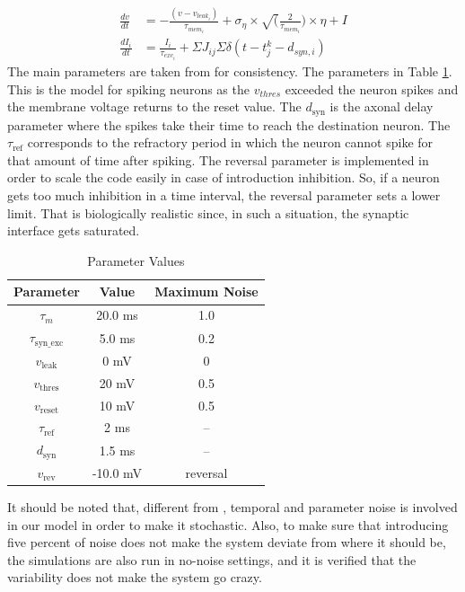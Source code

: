 \documentclass[a4paper,12pt]{article}
\begin{document}
\begin{equation}
    \begin{split}
        \frac{dv}{dt} & = -\frac{(v - v_{leak_i})}{\tau_{mem_i}}+ \sigma_\eta \times \sqrt(\frac{2}{\tau_{mem_i}}) \times \eta + I \\
        \frac{dI_{i}}{dt} & = \frac{I_{i}}{\tau_{exc_i}} + \Sigma J_{ij} \Sigma \delta (t - t_j^k - d_{syn,i} )
    \end{split}
    \label{diff_eqn}
\end{equation}
The main parameters are taken from \cite{brunel} for consistency. The parameters in Table \ref{parameterset}. This is the model for spiking neurons as the $v_{thres}$ exceeded the neuron spikes and the membrane voltage returns to the reset value. The $d_{\text{syn}}$ is the axonal delay parameter where the spikes take their time to reach the destination neuron. The $\tau_{\text{ref}}$ corresponds to the refractory period in which the neuron cannot spike for that amount of time after spiking. The reversal parameter is implemented in order to scale the code easily in case of introduction inhibition. So, if a neuron gets too much inhibition in a time interval, the reversal parameter sets a lower limit. That is biologically realistic since, in such a situation, the synaptic interface gets saturated.

\begin{table}[h]
    \centering
    \begin{tabular}{|c|c|c|}
    \hline
    Parameter & Value & Maximum Noise \\
    \hline
    $\tau_m$ & 20.0 ms & 1.0 \\
    $\tau_{\text{syn\_exc}}$ & 5.0 ms & 0.2 \\
    $v_{\text{leak}}$ & 0 mV & 0 \\
    $v_{\text{thres}}$ & 20 mV & 0.5 \\
    $v_{\text{reset}}$ & 10 mV & 0.5 \\
    $\tau_{\text{ref}}$ & 2 ms & -- \\
    $d_{\text{syn}}$ & 1.5 ms & -- \\
    $v_{\text{rev}}$ & -10.0 mV & reversal \\
    \hline
    \end{tabular}
    \caption{Parameter Values}
    \label{parameterset}
\end{table}
It should be noted that, different from \cite{brunel}, temporal and parameter noise is involved in our model in order to make it stochastic. Also, to make sure that introducing five percent of noise does not make the system deviate from where it should be, the simulations are also run in no-noise settings, and it is verified that the variability does not make the system go crazy.
\end{document}
